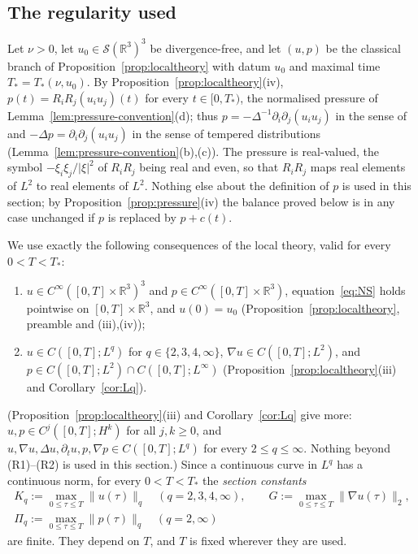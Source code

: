 \documentclass[11pt]{article}
\theoremstyle{definition}
\theoremstyle{plain}
\newcommand{\R}{\mathbb R}
\newcommand{\norm}[1]{\lVert #1\rVert}
\begin{document}
\subsection*{The regularity used}

\begin{sloppypar}
Let $\nu>0$, let $u_0\in\mathcal S(\R^3)^3$ be divergence-free, and let
$(u,p)$ be the classical branch of Proposition~\ref{prop:localtheory} with
datum $u_0$ and maximal time $T_*=T_*(\nu,u_0)$.  By
Proposition~\ref{prop:localtheory}(iv), $p(t)=R_iR_j(u_iu_j)(t)$ for every
$t\in[0,T_*)$, the normalised pressure of
Lemma~\ref{lem:pressure-convention}(d); thus
$p=-\Delta^{-1}\partial_i\partial_j(u_iu_j)$ in the sense of
\cite[eq.~(14), p.~38]{Tao2013} and $-\Delta p=\partial_i\partial_j(u_iu_j)$
in the sense of tempered distributions
(Lemma~\ref{lem:pressure-convention}(b),(c)).  The pressure is real-valued,
the symbol $-\xi_i\xi_j/|\xi|^2$ of $R_iR_j$ being real and even, so that
$R_iR_j$ maps real elements of $L^2$ to real elements of $L^2$.  Nothing
else about the definition of $p$ is used in this section; by
Proposition~\ref{prop:pressure}(iv) the balance proved below is in any case
unchanged if $p$ is replaced by $p+c(t)$.
\end{sloppypar}

We use exactly the following consequences of the local theory, valid for
every $0<T<T_*$:
\begin{enumerate}
\item[(R1)] $u\in C^\infty([0,T]\times\R^3)^3$ and
 $p\in C^\infty([0,T]\times\R^3)$, equation~\eqref{eq:NS} holds pointwise on
 $[0,T]\times\R^3$, and $u(0)=u_0$ (Proposition~\ref{prop:localtheory},
 preamble and (iii),(iv));
\item[(R2)] $u\in C([0,T];L^q)$ for $q\in\{2,3,4,\infty\}$,
 $\nabla u\in C([0,T];L^2)$, and $p\in C([0,T];L^2)\cap C([0,T];L^\infty)$
 (Proposition~\ref{prop:localtheory}(iii) and Corollary~\ref{cor:Lq}).
\end{enumerate}
(Proposition~\ref{prop:localtheory}(iii) and Corollary~\ref{cor:Lq} give
more: $u,p\in C^j([0,T];H^k)$ for all $j,k\geq0$, and
$u,\nabla u,\Delta u,\partial_tu,p,\nabla p\in C([0,T];L^q)$ for every
$2\leq q\leq\infty$.  Nothing beyond (R1)--(R2) is used in this section.)
Since a continuous curve in $L^q$ has a continuous norm, for every
$0<T<T_*$ the \emph{section constants}
\[
\begin{gathered}
 K_q:=\max_{0\leq\tau\leq T}\norm{u(\tau)}_q\quad(q=2,3,4,\infty),\qquad
 G:=\max_{0\leq\tau\leq T}\norm{\nabla u(\tau)}_2,\\
 \Pi_q:=\max_{0\leq\tau\leq T}\norm{p(\tau)}_q\quad(q=2,\infty)
\end{gathered}
\]
are finite.  They depend on $T$, and $T$ is fixed wherever they are used.
\end{document}
